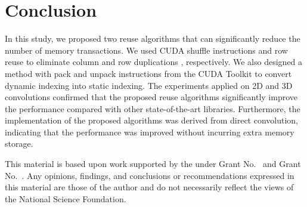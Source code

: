 \section{Conclusion}
In this study, we proposed two reuse algorithms that can significantly reduce the number of memory transactions. We used CUDA shuffle
instructions and row reuse to eliminate column and row duplications , respectively. We also designed a method with pack and unpack instructions from the CUDA Toolkit to convert dynamic indexing into static indexing. The experiments applied on 2D and 3D convolutions confirmed that the proposed reuse algorithms  significantly improve the performance compared with other state-of-the-art libraries. Furthermore, the implementation of the proposed algorithms was derived from direct convolution, indicating that the performance was improved without incurring extra memory storage.%
\begin{acks}                            %
  This material is based upon work supported by the
   under Grant
  No.~ and Grant
  No.~.  Any opinions, findings, and
  conclusions or recommendations expressed in this material are those
  of the author and do not necessarily reflect the views of the
  National Science Foundation.
\end{acks}
